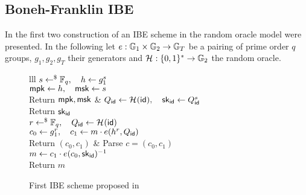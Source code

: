 
\subsection{Boneh-Franklin IBE}

In \cite{C:BonFra01} the first two construction of an IBE scheme in the random oracle model were presented. 
In the following let $e : \mathbb{G}_1 \times \mathbb{G}_2 \to \mathbb{G}_T$ be a pairing of prime order $q$ groups, $g_1, g_2, g_T$ their generators and $\mathcal{H}_{} : \{0,1\}^\ast \to \mathbb{G}_2$ the random oracle.

\begin{figure}[htb]
\centering
\begin{pcarray}{lll}
		{
			$s \gets^{\$} \mathbb{F}_q, \quad h \gets g_1^s$
				\\
			$\mathsf{mpk} \gets h, \quad \mathsf{msk} \gets s$
				\\
			Return $\mathsf{mpk}, \mathsf{msk}$
		}
	&
		{
			$Q_{\mathsf{id}} \gets \mathcal{H}_{}(\mathsf{id}), \quad \mathsf{sk}_{\mathsf{id}} \gets Q_{\mathsf{id}}^s$
				\\
			Return $\mathsf{sk}_{\mathsf{id}}$
		}
	\\
			{
				$r \gets^{\$} \mathbb{F}_q, \quad Q_{\mathsf{id}} \gets \mathcal{H}_{}(\mathsf{id})$
					\\
				$c_0 \gets g_1^r, \quad c_1 \gets m \cdot e(h^r, Q_{\mathsf{id}})$
					\\
				Return $(c_0, c_1)$
			}
	&
		{
			Parse $c = (c_0, c_1)$
				\\
			$m \gets c_1 \cdot e(c_0, \mathsf{sk}_{\mathsf{id}})^{-1}$
				\\
			Return $m$
		}
\end{pcarray}
\caption{First IBE scheme proposed in \cite{C:BonFra01}}
\label{prot:BonFra01:first}
\end{figure}

